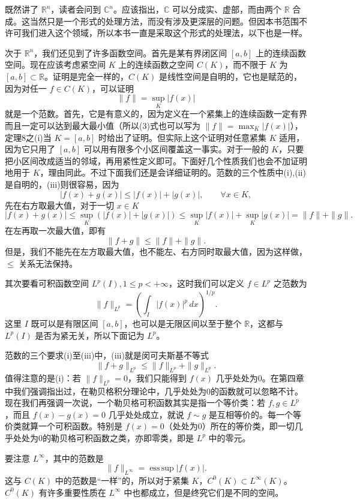 既然讲了 $\mathbb R^n$，读者会问到 $\mathbb C^n$。应该指出，$\mathbb C$ 可以分成实、虚部，而由两个 $\mathbb R$ 合成。这当然只是一个形式的处理方法，而没有涉及更深层的问题。但因本书范围不许可我们进入这个领域，所以本书一直是采取这个形式的处理法，以下也是一样。

次于 $\mathbb R^n$，我们还见到了许多函数空间。首先是某有界闭区间 $[a,b]$ 上的连续函数空间。现在应该考虑紧空间 $K$ 上的连续函数之空间 $C(K)$，而不限于 $K$ 为 $[a,b]\subset\mathbb R$。证明是完全一样的，$C(K)$ 是线性空间是自明的，它也是赋范的，因为对任一 $f\in C(K)$，可以证明
\[
 \|f\|=\sup_K|f(x)|
\]
就是一个范数。首先，它是有意义的，因为定义在一个紧集上的连续函数一定有界而且一定可以达到最大最小值（所以(3)式也可以写为 $\|f\|=\max_K|f(x)|$），定理8之(i)当 $K=[a,b]$ 时给出了证明。但实际上这个证明对任意紧集 $K$ 适用，因为它只用了 $[a,b]$ 可以用有限多个小区间覆盖这一事实。对于一般的 $K$，只要把小区间改成适当的邻域，再用紧性定义即可。下面好几个性质我们也会不加证明地用于 $K$，理由同此。不过下面我们还是会详细证明的。范数的三个性质中(i),(ii)是自明的，(iii)则很容易，因为
\[
 |f(x)+g(x)|\le |f(x)|+|g(x)|,\qquad \forall x\in K,
\]
先在右方取最大值，对于一切 $x\in K$
\[
 |f(x)+g(x)|\le \sup_K(|f(x)|+|g(x)|)
 \le \sup_K|f(x)|+\sup_K|g(x)|=\|f\|+\|g\|.
\]
在左再取一次最大值，即有
\[
 \|f+g\|\le \|f\|+\|g\|.
\]
但是，我们不能先在左方取最大值，也不能左、右方同时取最大值，因为这样做，$\le$ 关系无法保持。

其次要看可积函数空间 $L^p(I),1\le p<+\infty$，这时我们可以定义 $f\in L^p$ 之范数为
\begin{equation}
 \|f\|_{L^p}=\left(\int_I|f(x)|^p\,dx\right)^{1/p}.
 \tag{4}
\end{equation}
这里 $I$ 既可以是有限区间 $[a,b]$，也可以是无限区间以至于整个 $\mathbb R$，这都与 $L^p(I)$ 是否为紧无关，所以下面记为 $L^p$。

范数的三个要求(i)至(iii)中，(iii)就是闵可夫斯基不等式
\[
 \|f+g\|_{L^p}\le \|f\|_{L^p}+\|g\|_{L^p}.
\]
值得注意的是(i)：若 $\|f\|_{L^p}=0$，我们只能得到 $f(x)$ 几乎处处为0。在第四章中我们强调指出过，在勒贝格积分理论中，几乎处处为0的函数就可以忽略不计。现在我们再强调一次说，一个勒贝格可积函数其实是指一个等价类：若 $f,g\in L^p$，而且 $f(x)-g(x)=0$ 几乎处处成立，就说 $f\sim g$ 是互相等价的。每一个等价类就算一个可积函数。特别是 $f(x)=0$（处处为0）所在的等价类，即一切几乎处处为0的勒贝格可积函数之类，亦即零类，即是 $L^p$ 中的零元。

要注意 $L^\infty$，其中的范数是
\[
 \|f\|_{L^\infty}=\operatorname*{ess\,sup}|f(x)|.
\]
这与 $C(K)$ 中的范数是“一样”的，所以对于紧集 $K$，$C^0(K)\subset L^\infty(K)$。$C^0(K)$ 有许多重要性质在 $L^\infty$ 中也都成立，但是终究它们是不同的空间。

